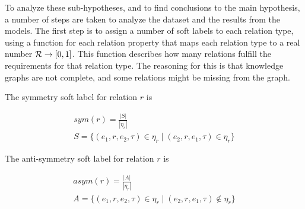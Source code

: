 



% 


To analyze these sub-hypotheses, and to find conclusions to the main hypothesis, a number of steps are taken to analyze the dataset and the results from the models. The first step is to assign a number of soft labels to each relation type, using a function for each relation property that maps each relation type to a real number $\mathcal{R} \rightarrow [ 0 , 1 ]$. This function describes how many relations fulfill the requirements for that relation type. The reasoning for this is that knowledge graphs are not complete, and some relations might be missing from the graph.

The symmetry soft label for relation $r$ is

\begin{equation}
\begin{gathered}
\mathit{sym}(r) = \frac{|S|}{|\eta_r|}\\
S = \{ (e_1, r, e_2, \tau) \in \eta_r \mid (e_2, r, e_1, \tau) \in \eta_r \}
\end{gathered}
\end{equation}

\noindent
The anti-symmetry soft label for relation $r$ is

\begin{equation}
\begin{gathered}
\mathit{asym}(r) = \frac{|A|}{|\eta_r|}\\
A = \{ (e_1, r, e_2, \tau) \in \eta_r \mid (e_2, r, e_1, \tau) \notin \eta_r \}
\end{gathered}
\end{equation}

